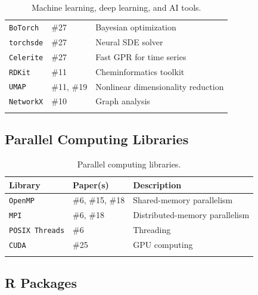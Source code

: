 \documentclass[11pt,letterpaper]{article}
\newcommand{\tool}[1]{\texttt{#1}}
\begin{document}
\begin{longtable}{l l p{6cm}}
\tool{BoTorch}         & \#27                   & Bayesian optimization \\
\tool{torchsde}        & \#27                   & Neural SDE solver \\
\tool{Celerite}        & \#27                   & Fast GPR for time series \\
\tool{RDKit}           & \#11                   & Cheminformatics toolkit \\
\tool{UMAP}            & \#11, \#19             & Nonlinear dimensionality reduction \\
\tool{NetworkX}        & \#10                   & Graph analysis \\
\bottomrule
\caption{Machine learning, deep learning, and AI tools.}
\end{longtable}

\subsection{Parallel Computing Libraries}

\begin{longtable}{l l p{7cm}}
\toprule
\textbf{Library} & \textbf{Paper(s)} & \textbf{Description} \\
\midrule
\tool{OpenMP}        & \#6, \#15, \#18 & Shared-memory parallelism \\
\tool{MPI}           & \#6, \#18       & Distributed-memory parallelism \\
\tool{POSIX Threads} & \#6             & Threading \\
\tool{CUDA}          & \#25            & GPU computing \\
\bottomrule
\caption{Parallel computing libraries.}
\end{longtable}

\subsection{R Packages}
\end{document}
